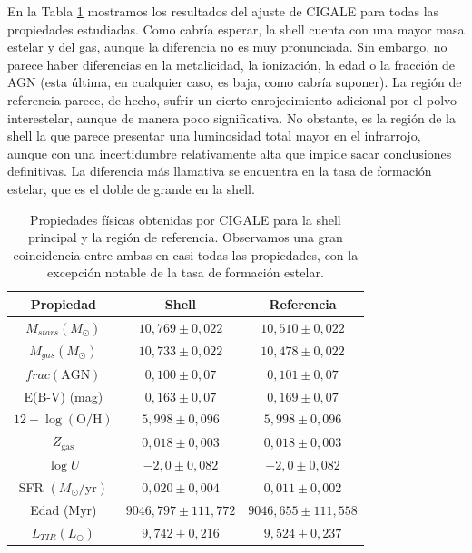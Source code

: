 En la Tabla \ref{tab:cigale} mostramos los resultados del ajuste de CIGALE para todas las propiedades estudiadas. Como cabría esperar, la shell cuenta con una mayor masa estelar y del gas, aunque la diferencia no es muy pronunciada. Sin embargo, no parece haber diferencias en la metalicidad, la ionización, la edad o la fracción de AGN (esta última, en cualquier caso, es baja, como cabría suponer). La región de referencia parece, de hecho, sufrir un cierto enrojecimiento adicional por el polvo interestelar, aunque de manera poco significativa. No obstante, es la región de la shell la que parece presentar una luminosidad total mayor en el infrarrojo, aunque con una incertidumbre relativamente alta que impide sacar conclusiones definitivas. La diferencia más llamativa se encuentra en la tasa de formación estelar, que es el doble de grande en la shell. 


\begin{table}[]
\centering
\begin{tabular}{|c|c|c|}
\hline
Propiedad                        & Shell                    & Referencia               \\ \hline
\(M_{stars} (M_{\odot})\)        & \(10,769 \pm 0,022\)     & \(10,510 \pm 0,022\)     \\ \hline
\(M_{gas} (M_{\odot})\)         & \(10,733 \pm 0,022\)     & \(10,478 \pm 0,022\)     \\ \hline
\(frac(\text{AGN})\)             & \(0,100 \pm 0,07\)       & \(0,101 \pm 0,07\)       \\ \hline
E(B-V) (mag)                     & \(0,163 \pm 0,07\)       & \(0,169 \pm 0,07\)       \\ \hline
\(12+\log{(\text{O}/\text{H})}\) & \(5,998 \pm 0,096\)      & \(5,998 \pm 0,096\)      \\ \hline
\(Z_{\text{gas}}\)               & \(0,018 \pm 0,003\)      & \(0,018 \pm 0,003\)      \\ \hline
\(\log{U}\)                      & \(-2,0 \pm 0,082\)       & \(-2,0 \pm 0,082\)       \\ \hline
SFR \((M_{\odot}/\text{yr})\)    & \(0,020 \pm 0,004\)      & \(0,011 \pm 0,002\)      \\ \hline
Edad (Myr)                       & \(9046,797 \pm 111,772\) & \(9046,655 \pm 111,558\) \\ \hline
\(L_{TIR} (L_{\odot})\)         & \(9,742 \pm 0,216\)      & \(9,524 \pm 0,237\)      \\ \hline
\end{tabular}
\caption{Propiedades físicas obtenidas por CIGALE para la shell principal y la región de referencia. Observamos una gran coincidencia entre ambas en casi todas las propiedades, con la excepción notable de la tasa de formación estelar.\label{tab:cigale}}
\end{table}



